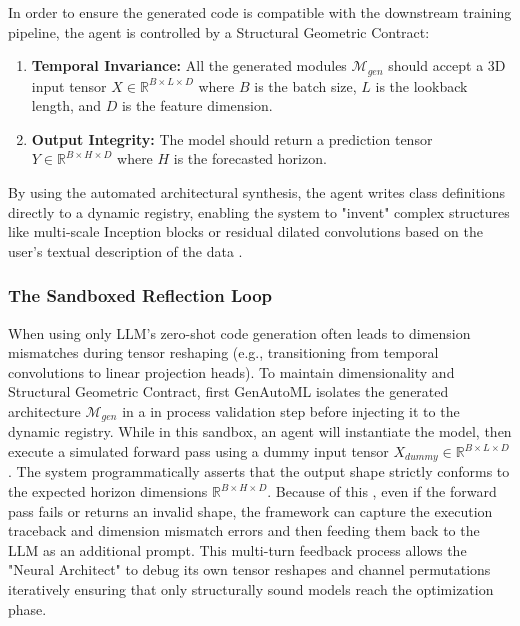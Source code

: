 \documentclass{article}
\begin{document}
In order to ensure the generated code is compatible with the downstream training pipeline, the agent is controlled by a Structural Geometric Contract:
\begin{enumerate}
\item \textbf{Temporal Invariance:} All the generated modules $\mathcal{M}_{gen}$ should accept a 3D input tensor $X \in \mathbb{R}^{B \times L \times D}$ where $B$ is the batch size, $L$ is the lookback length, and $D$ is the feature dimension.

\item \textbf{Output Integrity:} The model should return a prediction tensor $Y \in \mathbb{R}^{B \times H \times D}$ where $H$ is the forecasted horizon.
\end{enumerate}

By using the automated architectural synthesis, the agent writes class definitions directly to a dynamic registry, enabling the system to "invent" complex structures like multi-scale Inception blocks \cite{szegedy2015going} or residual dilated convolutions based on the user's textual description of the data \cite{he2016}.

\subsubsection{The Sandboxed Reflection Loop}
When using only LLM's zero-shot code generation often leads to dimension mismatches during tensor reshaping (e.g., transitioning from temporal convolutions to linear projection heads). To maintain dimensionality and Structural Geometric Contract, first GenAutoML isolates the generated architecture $\mathcal{M}_{gen}$ in a in process validation step before injecting it to the dynamic registry. While in this sandbox, an agent will instantiate the model, then execute a simulated forward pass using a dummy input tensor $X_{dummy} \in \mathbb{R}^{B \times L \times D}$. The system programmatically asserts that the output shape strictly conforms to the expected horizon dimensions $\mathbb{R}^{B \times H \times D}$. Because of this , even if the forward pass fails or returns an invalid shape, the framework can capture the execution traceback and dimension mismatch errors and then feeding them back to the LLM as an additional prompt. This multi-turn feedback process allows the "Neural Architect" to debug its own tensor reshapes and channel permutations iteratively ensuring that only structurally sound models reach the optimization phase.
\end{document}
